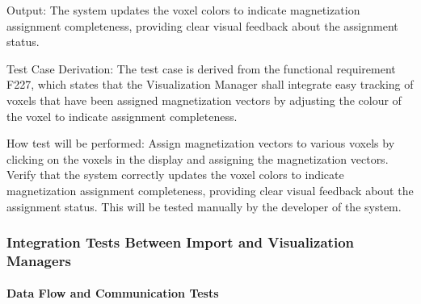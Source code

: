 \documentclass[12pt, titlepage]{article}
\begin{document}
\begin{enumerate}
Output: The system updates the voxel colors to indicate magnetization assignment completeness, providing clear visual feedback about the assignment status.

Test Case Derivation: The test case is derived from the functional requirement F227, which states that the Visualization Manager shall integrate easy tracking of voxels that have been assigned magnetization vectors by adjusting the colour of the voxel to indicate assignment completeness.
					
How test will be performed: Assign magnetization vectors to various voxels by clicking on the voxels in the display and assigning the magnetization vectors. Verify that the system correctly updates the voxel colors to indicate magnetization assignment completeness, providing clear visual feedback about the assignment status. This will be tested manually by the developer of the system.

\end{enumerate}

\subsubsection{Integration Tests Between Import and Visualization Managers}


\paragraph{Data Flow and Communication Tests}
\end{document}

